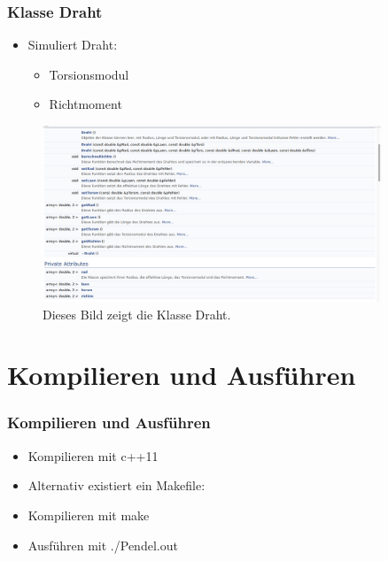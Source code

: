 \documentclass[11pt]{beamer}
\begin{document}
\begin{frame}
\frametitle{Klasse Draht}
\begin{itemize}
\item Simuliert Draht:
\begin{itemize}
\item Torsionsmodul
\item Richtmoment
\end{itemize}
\end{itemize}
\begin{figure} [H]
\centering
\includegraphics[width=0.9\textwidth]{Draht.jpg}
\caption{Dieses Bild zeigt die Klasse Draht.}
\end{figure}
\end{frame}

\section{Kompilieren und Ausführen}
\begin{frame}
\frametitle{Kompilieren und Ausführen}
\begin{itemize}
\item Kompilieren mit c++11
\item Alternativ existiert ein Makefile:
\item Kompilieren mit make
\item Ausführen mit ./Pendel.out
\end{itemize}
\end{frame}
\end{document}

